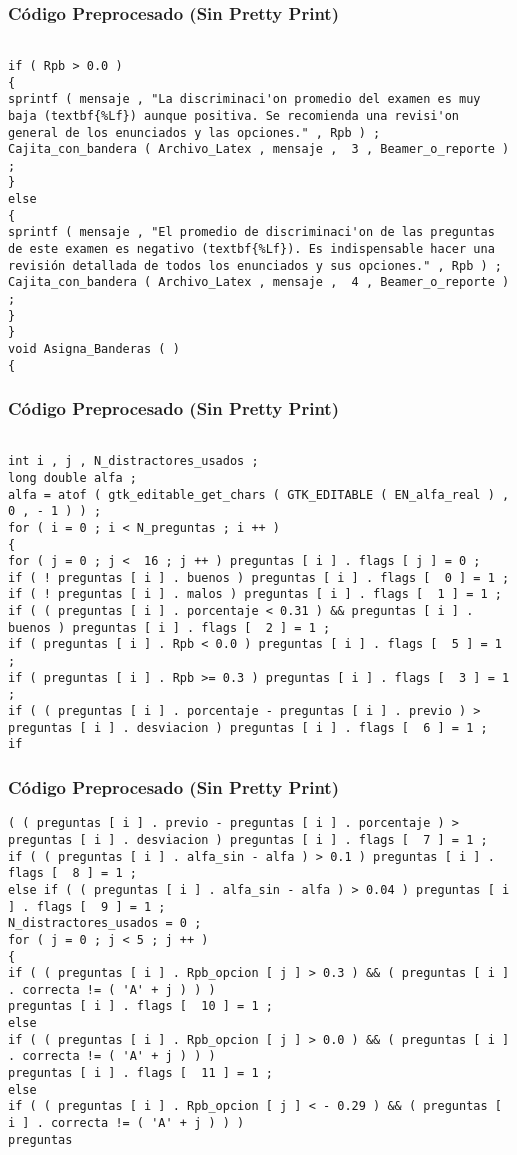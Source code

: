 \documentclass{beamer}
\begin{document}
\begin{frame}[fragile]
\frametitle{C\'odigo Preprocesado (Sin Pretty Print)}
\begin{lstlisting}[style=CStyle]

if ( Rpb > 0.0 ) 
{ 
sprintf ( mensaje , "La discriminaci'on promedio del examen es muy baja (textbf{%Lf}) aunque positiva. Se recomienda una revisi'on general de los enunciados y las opciones." , Rpb ) ; 
Cajita_con_bandera ( Archivo_Latex , mensaje ,  3 , Beamer_o_reporte ) ; 
} 
else 
{ 
sprintf ( mensaje , "El promedio de discriminaci'on de las preguntas de este examen es negativo (textbf{%Lf}). Es indispensable hacer una revisión detallada de todos los enunciados y sus opciones." , Rpb ) ; 
Cajita_con_bandera ( Archivo_Latex , mensaje ,  4 , Beamer_o_reporte ) ; 
} 
} 
void Asigna_Banderas ( ) 
{ \end{lstlisting}
\end{frame}
\begin{frame}[fragile]
\frametitle{C\'odigo Preprocesado (Sin Pretty Print)}
\begin{lstlisting}[style=CStyle]

int i , j , N_distractores_usados ; 
long double alfa ; 
alfa = atof ( gtk_editable_get_chars ( GTK_EDITABLE ( EN_alfa_real ) , 0 , - 1 ) ) ; 
for ( i = 0 ; i < N_preguntas ; i ++ ) 
{ 
for ( j = 0 ; j <  16 ; j ++ ) preguntas [ i ] . flags [ j ] = 0 ; 
if ( ! preguntas [ i ] . buenos ) preguntas [ i ] . flags [  0 ] = 1 ; 
if ( ! preguntas [ i ] . malos ) preguntas [ i ] . flags [  1 ] = 1 ; 
if ( ( preguntas [ i ] . porcentaje < 0.31 ) && preguntas [ i ] . buenos ) preguntas [ i ] . flags [  2 ] = 1 ; 
if ( preguntas [ i ] . Rpb < 0.0 ) preguntas [ i ] . flags [  5 ] = 1 ; 
if ( preguntas [ i ] . Rpb >= 0.3 ) preguntas [ i ] . flags [  3 ] = 1 ; 
if ( ( preguntas [ i ] . porcentaje - preguntas [ i ] . previo ) > preguntas [ i ] . desviacion ) preguntas [ i ] . flags [  6 ] = 1 ; 
if \end{lstlisting}
\end{frame}
\begin{frame}[fragile]
\frametitle{C\'odigo Preprocesado (Sin Pretty Print)}
\begin{lstlisting}[style=CStyle]
( ( preguntas [ i ] . previo - preguntas [ i ] . porcentaje ) > preguntas [ i ] . desviacion ) preguntas [ i ] . flags [  7 ] = 1 ; 
if ( ( preguntas [ i ] . alfa_sin - alfa ) > 0.1 ) preguntas [ i ] . flags [  8 ] = 1 ; 
else if ( ( preguntas [ i ] . alfa_sin - alfa ) > 0.04 ) preguntas [ i ] . flags [  9 ] = 1 ; 
N_distractores_usados = 0 ; 
for ( j = 0 ; j < 5 ; j ++ ) 
{ 
if ( ( preguntas [ i ] . Rpb_opcion [ j ] > 0.3 ) && ( preguntas [ i ] . correcta != ( 'A' + j ) ) ) 
preguntas [ i ] . flags [  10 ] = 1 ; 
else 
if ( ( preguntas [ i ] . Rpb_opcion [ j ] > 0.0 ) && ( preguntas [ i ] . correcta != ( 'A' + j ) ) ) 
preguntas [ i ] . flags [  11 ] = 1 ; 
else 
if ( ( preguntas [ i ] . Rpb_opcion [ j ] < - 0.29 ) && ( preguntas [ i ] . correcta != ( 'A' + j ) ) ) 
preguntas \end{lstlisting}
\end{frame}
\end{document}

